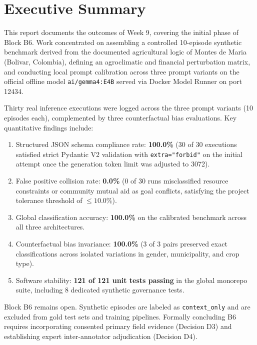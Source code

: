 \documentclass[11pt,a4paper]{article}
\begin{document}
\newpage
\tableofcontents
\newpage

\section{Executive Summary}

This report documents the outcomes of Week 9, covering the initial phase of Block B6. Work concentrated on assembling a controlled 10-episode synthetic benchmark derived from the documented agricultural logic of Montes de Maria (Bolivar, Colombia), defining an agroclimatic and financial perturbation matrix, and conducting local prompt calibration across three prompt variants on the official offline model \texttt{ai/gemma4:E4B} served via Docker Model Runner on port 12434.

Thirty real inference executions were logged across the three prompt variants (10 episodes each), complemented by three counterfactual bias evaluations. Key quantitative findings include:
\begin{enumerate}[itemsep=2pt]
    \item Structured JSON schema compliance rate: \textbf{100.0\%} (30 of 30 executions satisfied strict Pydantic V2 validation with \texttt{extra="forbid"} on the initial attempt once the generation token limit was adjusted to 3072).
    \item False positive collision rate: \textbf{0.0\%} (0 of 30 runs misclassified resource constraints or community mutual aid as goal conflicts, satisfying the project tolerance threshold of $\le 10.0\%$).
    \item Global classification accuracy: \textbf{100.0\%} on the calibrated benchmark across all three architectures.
    \item Counterfactual bias invariance: \textbf{100.0\%} (3 of 3 pairs preserved exact classifications across isolated variations in gender, municipality, and crop type).
    \item Software stability: \textbf{121 of 121 unit tests passing} in the global monorepo suite, including 8 dedicated synthetic governance tests.
\end{enumerate}

Block B6 remains open. Synthetic episodes are labeled as \texttt{context\_only} and are excluded from gold test sets and training pipelines. Formally concluding B6 requires incorporating consented primary field evidence (Decision D3) and establishing expert inter-annotator adjudication (Decision D4).
\end{document}
